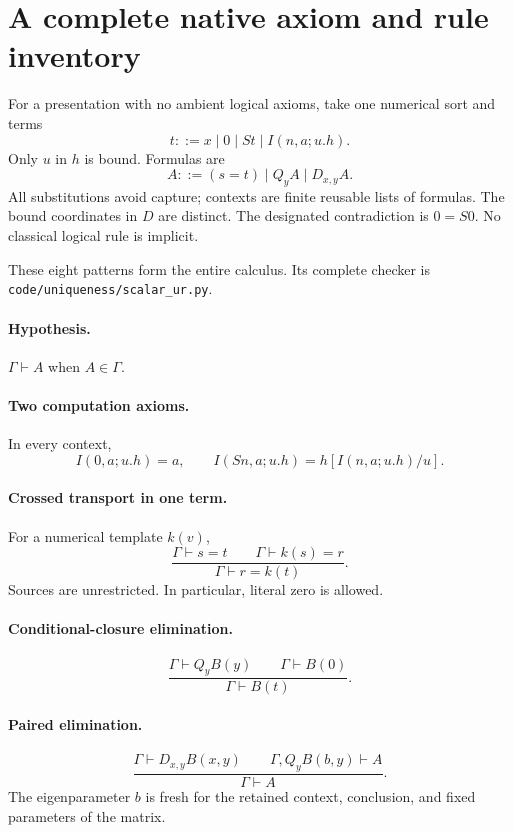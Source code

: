 \documentclass[11pt]{article}
\theoremstyle{definition}\newtheorem{definition}[theorem]{Definition}
\newcommand{\file}[1]{{\small\nolinkurl{#1}}}
\begin{document}
\section{A complete native axiom and rule inventory}
\label{sec:native-inventory}

For a presentation with no ambient logical axioms, take one numerical sort
and terms
\[
 t::=x\mid0\mid St\mid I(n,a;u.h).
\]
Only $u$ in $h$ is bound.  Formulas are
\[
 A::=(s=t)\mid Q_yA\mid D_{x,y}A.
\]
All substitutions avoid capture; contexts are finite reusable lists of
formulas.  The bound coordinates in $D$ are distinct.  The designated
contradiction is $0=S0$.  No classical logical rule is implicit.

These eight patterns form the entire calculus.  Its complete checker is
\file{code/uniqueness/scalar_ur.py}.

\paragraph{Hypothesis.} $\Gamma\vdash A$ when $A\in\Gamma$.

\paragraph{Two computation axioms.} In every context,
\[
 I(0,a;u.h)=a,\qquad
 I(Sn,a;u.h)=h[I(n,a;u.h)/u].
\]

\paragraph{Crossed transport in one term.} For a numerical template $k(v)$,
\[
 \frac{\Gamma\vdash s=t\qquad\Gamma\vdash k(s)=r}
      {\Gamma\vdash r=k(t)}.                            \tag{Tr}
\]
Sources are unrestricted.  In particular, literal zero is allowed.

\paragraph{Conditional-closure elimination.}
\[
 \frac{\Gamma\vdash Q_yB(y)\qquad\Gamma\vdash B(0)}
      {\Gamma\vdash B(t)}.                             \tag{QE}
\]

\paragraph{Paired elimination.}
\[
 \frac{\Gamma\vdash D_{x,y}B(x,y)\qquad
       \Gamma,Q_yB(b,y)\vdash A}
      {\Gamma\vdash A}.                               \tag{DE}
\]
The eigenparameter $b$ is fresh for the retained context, conclusion,
and fixed parameters of the matrix.
\end{document}
